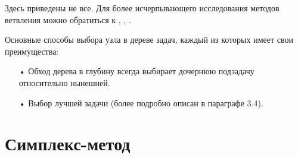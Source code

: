 \documentclass[a4paper,14pt,russian]{extreport}
\begin{document}
\par Здесь приведены не все. Для более исчерпывающего исследования методов ветвления можно обратиться к \cite{land_powell}, \cite{linderoth}, \cite{fuegenschuh}.
\par Основные способы выбора узла в дереве задач, каждый из которых имеет свои преимущества:
  \begin{itemize}
  \item[•] Обход дерева в глубину \cite{dakin} всегда выбирает дочернюю подзадачу относительно нынешней.
  \item[•] Выбор лучшей задачи (более подробно описан в параграфе 3.4).
  \end{itemize}


\section{Симплекс-метод}
\end{document}
